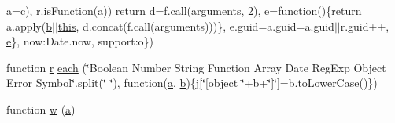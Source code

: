 \begin{DoxyCompactItemize}
\hyperlink{jquery-3_8js_aa4d4888597588a84fd5b1184d00c91f3}{a}=\hyperlink{jquery-3_8js_abce695e0af988ece0826d9ad59b8160d}{c}), r.\+is\+Function(\hyperlink{jquery-3_8js_aa4d4888597588a84fd5b1184d00c91f3}{a})) return \hyperlink{jquery-3_8js_aeb337d295abaddb5ec3cb34cc2e2bbc9}{d}=f.\+call(arguments, 2), \hyperlink{popper_8js_a2c038346d47955cbe2cb91e338edd7e1}{e}=function()\{return a.\+apply(\hyperlink{jquery-3_8js_ac0431efac4d7c393d1e70b86115cb93f}{b}$\vert$$\vert$\hyperlink{bootstrap_8js_a05c09a5e9d53fa7adf0a7936038c2fa3}{this}, d.\+concat(f.\+call(arguments)))\}, e.\+guid=a.\+guid=a.\+guid$\vert$$\vert$r.\+guid++, \hyperlink{popper_8js_a2c038346d47955cbe2cb91e338edd7e1}{e}\}, now\+:\+Date.\+now, support\+:o\})
\item 
function \hyperlink{bootstrap_8js_a1e99b66ec05f848b367484f62b1d1521}{r} \hyperlink{jquery-3_8js_a15d8398b77829795291db9587eaa2e94}{each} (\char`\"{}Boolean Number String Function Array Date Reg\+Exp Object Error Symbol\char`\"{}.split(\char`\"{} \char`\"{}), function(\hyperlink{jquery-3_8js_aa4d4888597588a84fd5b1184d00c91f3}{a}, \hyperlink{jquery-3_8js_ac0431efac4d7c393d1e70b86115cb93f}{b})\{\hyperlink{jquery-3_8js_aab858032a95af802114b255fac6f45f2}{j}\mbox{[}\char`\"{}\mbox{[}object \char`\"{}+b+\char`\"{}\mbox{]}\char`\"{}\mbox{]}=b.\+to\+Lower\+Case()\})
\item 
function \hyperlink{jquery-3_8js_a9e7acde64afa4ba72de6fa724a96c17a}{w} (\hyperlink{jquery-3_8js_aa4d4888597588a84fd5b1184d00c91f3}{a})
\end{DoxyCompactItemize}
